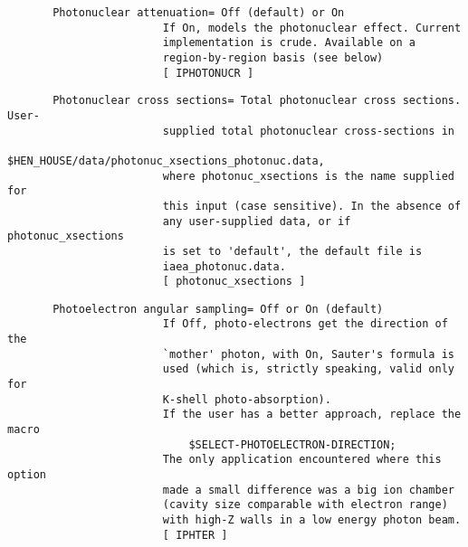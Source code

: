 \begin{verbatim}
       Photonuclear attenuation= Off (default) or On
                        If On, models the photonuclear effect. Current
                        implementation is crude. Available on a
                        region-by-region basis (see below)
                        [ IPHOTONUCR ]
\end{verbatim}
\begin{verbatim}
       Photonuclear cross sections= Total photonuclear cross sections. User-
                        supplied total photonuclear cross-sections in
                        $HEN_HOUSE/data/photonuc_xsections_photonuc.data,
                        where photonuc_xsections is the name supplied for
                        this input (case sensitive). In the absence of
                        any user-supplied data, or if photonuc_xsections
                        is set to 'default', the default file is
                        iaea_photonuc.data.
                        [ photonuc_xsections ]
\end{verbatim}
\begin{verbatim}
       Photoelectron angular sampling= Off or On (default)
                        If Off, photo-electrons get the direction of the
                        `mother' photon, with On, Sauter's formula is
                        used (which is, strictly speaking, valid only for
                        K-shell photo-absorption).
                        If the user has a better approach, replace the macro
                            $SELECT-PHOTOELECTRON-DIRECTION;
                        The only application encountered where this option
                        made a small difference was a big ion chamber
                        (cavity size comparable with electron range)
                        with high-Z walls in a low energy photon beam.
                        [ IPHTER ]
\end{verbatim}
